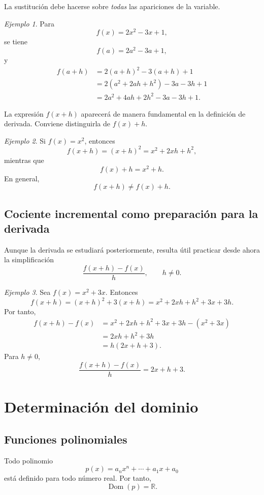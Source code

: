 \documentclass[12pt]{article}
\theoremstyle{remark}
\newtheorem{ejemplo}{Ejemplo}[section]
\newcommand{\R}{\mathbb{R}}
\newcommand{\Dom}{\operatorname{Dom}}
\begin{document}
La sustitución debe hacerse sobre \emph{todas} las apariciones de la variable.

\begin{ejemplo}
Para
\[
f(x)=2x^2-3x+1,
\]
se tiene
\[
f(a)=2a^2-3a+1,
\]
y
\begin{align*}
f(a+h)
 &=2(a+h)^2-3(a+h)+1\\
 &=2(a^2+2ah+h^2)-3a-3h+1\\
 &=2a^2+4ah+2h^2-3a-3h+1.
\end{align*}
\end{ejemplo}

La expresión $f(x+h)$ aparecerá de manera fundamental en la definición de
derivada. Conviene distinguirla de $f(x)+h$.

\begin{ejemplo}
Si $f(x)=x^2$, entonces
\[
f(x+h)=(x+h)^2=x^2+2xh+h^2,
\]
mientras que
\[
f(x)+h=x^2+h.
\]
En general,
\[
f(x+h)\neq f(x)+h.
\]
\end{ejemplo}

\subsection{Cociente incremental como preparación para la derivada}

Aunque la derivada se estudiará posteriormente, resulta útil practicar desde
ahora la simplificación
\[
\frac{f(x+h)-f(x)}{h},\qquad h\neq0.
\]

\begin{ejemplo}
Sea $f(x)=x^2+3x$. Entonces
\[
f(x+h)=(x+h)^2+3(x+h)
=x^2+2xh+h^2+3x+3h.
\]
Por tanto,
\begin{align*}
f(x+h)-f(x)
&=x^2+2xh+h^2+3x+3h-(x^2+3x)\\
&=2xh+h^2+3h\\
&=h(2x+h+3).
\end{align*}
Para $h\neq0$,
\[
\frac{f(x+h)-f(x)}{h}=2x+h+3.
\]
\end{ejemplo}

\section{Determinación del dominio}

\subsection{Funciones polinomiales}

Todo polinomio
\[
p(x)=a_nx^n+\cdots+a_1x+a_0
\]
está definido para todo número real. Por tanto,
\[
\Dom(p)=\R.
\]
\end{document}
